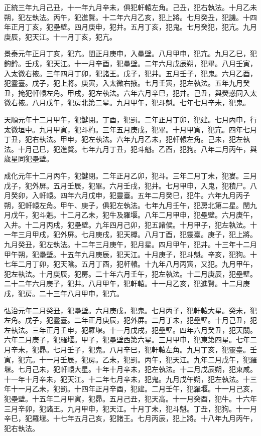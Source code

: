 \begin{pinyinscope}
正統三年九月己丑，十一年九月辛未，俱犯軒轅左角。己丑，犯右執法。十月乙未朔，犯左執法。丙午，犯進賢。十二年六月乙亥，犯上將。七月癸丑，犯譏。十四年正月丁亥，犯壘壁。四月庚申，犯井。五月丁亥，犯鬼。七月癸犯，犯亢。九月庚辰，犯天江。十一月丁亥，犯亢。

景泰元年正月丁亥，犯亢。閏正月庚申，入壘壁。八月甲申，犯亢。九月乙巳，犯鉤鈐。壬戌，犯天江。十一月辛酉，犯壘壁。二年六月戊辰朔，犯畢。八月壬寅，入太微右掖。三年四月丁卯，犯諸王。戊子，犯井。五月壬子，犯鬼。六月乙酉，犯靈臺。戊子，犯上將。庚寅，入太微右掖。七月壬寅，犯左執法。五年九月癸丑，掩犯軒轅左角。甲戌，犯左執法。六年六月辛巳，犯井。己丑，與熒惑同入太微右掖。八月戊午，犯房北第二星。九月甲午，犯斗魁。七年七月辛未，犯鬼。

天順元年十二月甲午，犯鍵閉。丁酉，犯罰。二年正月丁卯，犯建。七月丙申，行太微垣中。九月甲寅，犯斗杓。三年五月庚戌，犯畢。十月甲寅，犯亢。四年七月丁丑，犯右執法。甲申，犯左執法。六年九月乙未，犯軒轅左角。己未，犯左執法。十月己巳，犯進賢。七年九月丁丑，犯斗魁。乙酉，犯狗。八年二月丙午，與歲星同犯壘壁。

成化元年十二月丙午，犯鍵閉。二年正月乙卯，犯斗。三年二月丁未，犯婁。三月戊子，犯外屏。五月壬辰，犯畢。六月壬戌，犯井。七月甲申，入鬼，犯積尸。八月癸卯，入軒轅。四年六月戊申，犯靈臺。五年二月癸巳，犯牛。六年九月丙子朔，犯軒轅左角。甲午、庚子，俱犯左執法。七年九月壬午，犯房北第二星。閏九月戊午，犯斗魁。十二月乙未，犯牛及羅堰。八年二月甲申，犯壘壁。六月庚午，入井。十二月丙戌，犯壘壁。九年四月己卯，犯五諸侯。十月甲子，犯左執法。十一年三月甲戌，犯外屏。七月庚戌，犯天樽。八月丁酉，犯靈臺。庚子，犯上將。九月癸丑，犯左執法。十二年三月庚午，犯月星。四月甲午，犯井。十三年十二月甲午朔，犯壘壁。十五年九月庚辰，犯天江。十月庚子，犯斗魁。辛亥，犯狗。十七年二月丁卯，犯天陰。五月丁酉，犯軒轅。十九年八月丙寅，又犯。九月甲午，犯左執法。十月庚辰，犯房。二十年六月壬午，犯左執法。十二月庚辰，犯壘壁。二十二年六月庚子，犯井。八月甲午，犯軒轅。十一月乙亥，犯進賢。十二月庚戌，犯房。二十三年八月甲申，犯亢。

弘治元年二月癸丑，犯壘壁。六月庚戌，犯鬼。七月丙子，犯軒轅大星。癸未，犯左角。戊子，犯靈臺。二年正月庚辰，犯外屏。二月丁未，犯壘壁。十月己丑，犯左執法。三年正月壬申，犯羅堰。十一月戊戌，犯壘壁。四年六月癸丑，犯天關。六年二月庚子，犯羅堰。甲子，犯壘壁西第六星。三月甲申，犯東第四星。七年二月辛未，犯昴。七月壬子，犯鬼。八月辛巳，犯軒轅左角。九月丁亥，犯靈臺。壬寅，犯亢。十一月壬辰，犯房。乙未，犯罰。丙午，犯天江。九年二月戊午，犯羅堰。七月己未，犯軒轅大星。十年十月辛未，犯左執法。十二月戊辰朔，犯東咸。十一年十月辛未，犯天江。十二年七月辛未，犯鬼。九月戊午朔，犯左執法。十三年十一月乙未，犯罰。十四年正月辛酉，犯建。二月壬午，犯羅堰。十一月己亥，犯壘壁。十五年二月甲寅，犯昴。五月己丑，犯天高。十一月癸酉，犯牛。十六年三月辛卯，犯諸王。九月甲申，犯天江。十月丁未，犯斗魁。丁丑，犯狗。十一月辛巳，犯羅堰。十七年五月己亥，犯諸王。七月丙辰，犯上將。十八年九月丙午，犯右執法。


\end{pinyinscope}
